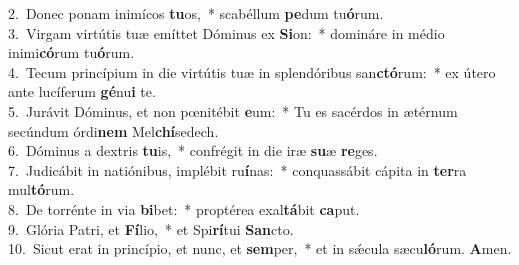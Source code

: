 {2.~}Donec ponam inimícos \textbf{tu}os,~* scabéllum \textbf{pe}dum tu\textbf{ó}rum.\\
{3.~}Virgam virtútis tuæ emíttet Dóminus ex \textbf{Si}on:~* domináre in médio inimi\textbf{có}rum tu\textbf{ó}rum.\\
{4.~}Tecum princípium in die virtútis tuæ in splendóribus san\textbf{ctó}rum:~* ex útero ante lucíferum \textbf{gé}nu\textbf{i} te.\\
{5.~}Jurávit Dóminus, et non pœnitébit \textbf{e}um:~* Tu es sacérdos in ætérnum secúndum órdi\textbf{nem} Mel\textbf{chí}sedech.\\
{6.~}Dóminus a dextris \textbf{tu}is,~* confrégit in die iræ \textbf{su}æ \textbf{re}ges.\\
{7.~}Judicábit in natiónibus, implébit ru\textbf{í}nas:~* conquassábit cápita in \textbf{ter}ra mul\textbf{tó}rum.\\
{8.~}De torrénte in via \textbf{bi}bet:~* proptérea exal\textbf{tá}bit \textbf{ca}put.\\
{9.~}Glória Patri, et \textbf{Fí}lio,~* et Spi\textbf{rí}tui \textbf{San}cto.\\
{10.~}Sicut erat in princípio, et nunc, et \textbf{sem}per,~* et in sǽcula sæcu\textbf{ló}rum. \textbf{A}men.\\
